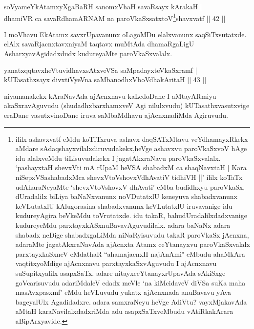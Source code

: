 \begin{shl}
soV\s yameYkAtamxyXgaBaRH sanomxVhaH savaRsayx kArakaH |\\
dhamiVR ca savaRdhamARNAM na paroVkaSxsatxtoV\s \footnote{ililx ashavxvatf eMdu koTiTxruva ashavx daqSATxMtavu veYdhamayxRkekx aMdare sAdaqshayxvilalxdiruvudakekx,\break heVge ashavxvu paroVkaSxvoV hAge idu alalxveMdu tiLisuvudakekx I jagatAkxraNavu paroVkaSxvalalx. `pashayxtaH shevxVti mA rUpaM heVSA shabadxM ca shaqNavxtaH | Kara niSepxVSashabadxMca shevxVtoV\s shovxV\break dhAvatiV tidhiVH ||' ililx koTaTx udAharaNeyaMte `shevxVtoV\s shovxV dhAvati' eMba budidhxyu paroVkaSx, dUradalilx biLiya baNaNxvanunx noVDutatxlU keneyuva shabadxvanunx keVLutatxlU kAlugorasina shabadxvanunx keVLutatxlU iruvavanige idu kudureyAgira beVkeMdu toVrutatxde. idu takaR, bahudUradalilxdadxvanige kudureyeMdu parxtayxkASxnuBavavAguvudilalx. adara baNaNx adara shabadx neDige shabadxgaLiMda niNaRyisuvudu takaR paroVkaSx jAcnxna, adaraMte jagatAkxraNavAda ajAcnxta Atamx ceYtanayxvu paroVkaSxvalalx parxtayxkaSxneV eMdathaR ``ahamajacnxH najAnAmi" eMbudu ahaMkAra vaqtitxyoMdige ajAcnxnavu parxtayxkaSxvAguvudu I ajAcnxnavu suSupitxyalilx asapxSaTx. adare nitayxceYtanayxrUpavAda sAkiSxge goVcarisuvudu adariMdaleV edadx meVle `na kiMcidaveV diVSa suKa maha masAvxpasxmf' eMdu heVLuvudu yukatx ajAcnxnada anuBavavu yAva bageyalUlx Agadidadxre. adara samxraNeyu heVge AdiVtu? vayxMjakavAda aMtaH karaNavilalxdadxriMda adu asapxSaTxveMbudu vAtiRkakArara aBipArxyavide.}shavxvatf \hfill || 42 ||
\end{shl}

\begin{artha}
I moVhavu EkAtamx savxrUpavanunx oLagoMDu elalxvanunx saqSiTxsutatxde. elAlx savaRjacnxtavxniyaM taqtavx muMtAda dhamaRgaLigU AsharxyavAgidadxdudx kudureyaMte paroVkaSxvalalx.
\end{artha}

\begin{shl}
yanatxqqtavxheVtuvidhavxsAtxveVSa saMpadayxteV\s kaSxramf |\\
kUTasathxsayx divxtiVyeVna saMbanodhxV\s boVdhakAritaH \hfill || 43 ||
\end{shl}

\begin{artha}%
niyamanakekx kAraNavAda ajAcnxnavu kaLedoDane I aMtayARmiyu akaSxravAguvudu (shudadhxbarxhamxveV Agi nilulxvudu) kUTasathxvasutxvige eraDane vasutxvinoDane iruva saMbaMdhavu ajAcnxnadiMda Agiruvudu.
\end{artha}

